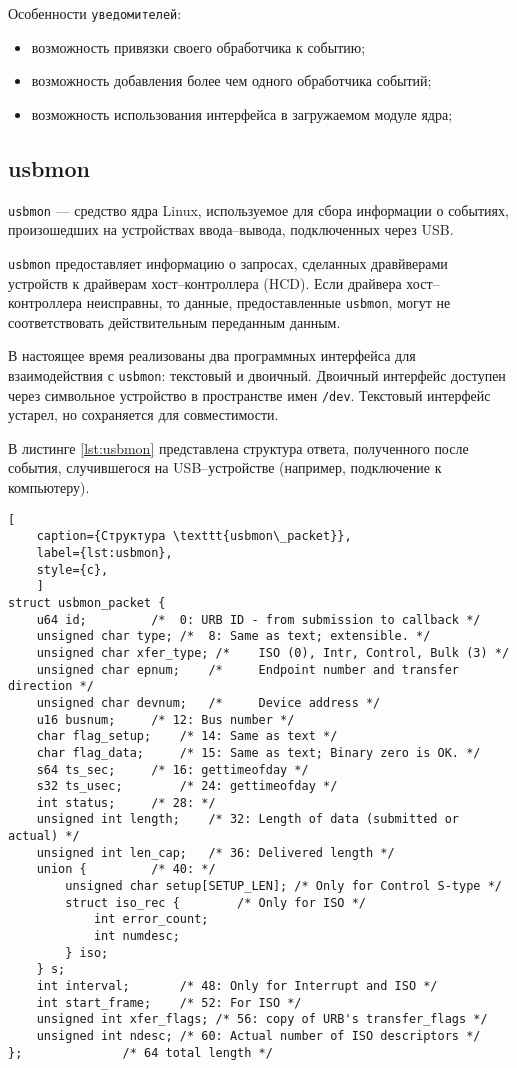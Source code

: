 Особенности \texttt{уведомителей}:

\begin{itemize}
	\item возможность привязки своего обработчика к событию;
	\item возможность добавления более чем одного обработчика событий;
	\item возможность использования интерфейса в загружаемом модуле ядра;
\end{itemize}

\subsection{usbmon}

\texttt{usbmon} \cite{usbmon} --- средство ядра Linux, используемое для сбора информации о событиях, произошедших на устройствах ввода--вывода, подключенных через USB.

\texttt{usbmon} предоставляет информацию о запросах, сделанных дравйверами устройств к драйверам хост--контроллера (HCD). Если драйвера хост--контроллера неисправны, то данные, предоставленные \texttt{usbmon}, могут не соответствовать действительным переданным данным.

В настоящее время реализованы два программных интерфейса для взаимодействия с \texttt{usbmon}: текстовый и двоичный. Двоичный интерфейс доступен через символьное устройство в пространстве имен \texttt{/dev}. Текстовый интерфейс устарел, но сохраняется для совместимости.

В листинге \ref{lst:usbmon} представлена структура ответа, полученного после события, случившегося на USB--устройстве (например, подключение к компьютеру).

\begin{lstlisting}[
	caption={Структура \texttt{usbmon\_packet}},
	label={lst:usbmon},
	style={c},
	]
struct usbmon_packet {
	u64 id;			/*  0: URB ID - from submission to callback */
	unsigned char type;	/*  8: Same as text; extensible. */
	unsigned char xfer_type; /*    ISO (0), Intr, Control, Bulk (3) */
	unsigned char epnum;	/*     Endpoint number and transfer direction */
	unsigned char devnum;	/*     Device address */
	u16 busnum;		/* 12: Bus number */
	char flag_setup;	/* 14: Same as text */
	char flag_data;		/* 15: Same as text; Binary zero is OK. */
	s64 ts_sec;		/* 16: gettimeofday */
	s32 ts_usec;		/* 24: gettimeofday */
	int status;		/* 28: */
	unsigned int length;	/* 32: Length of data (submitted or actual) */
	unsigned int len_cap;	/* 36: Delivered length */
	union {			/* 40: */
		unsigned char setup[SETUP_LEN];	/* Only for Control S-type */
		struct iso_rec {		/* Only for ISO */
			int error_count;
			int numdesc;
		} iso;
	} s;
	int interval;		/* 48: Only for Interrupt and ISO */
	int start_frame;	/* 52: For ISO */
	unsigned int xfer_flags; /* 56: copy of URB's transfer_flags */
	unsigned int ndesc;	/* 60: Actual number of ISO descriptors */
};				/* 64 total length */
\end{lstlisting}

